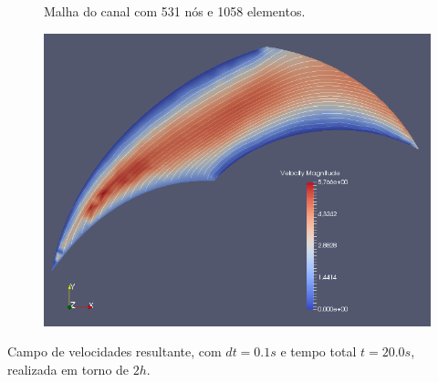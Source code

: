 \documentclass{beamer}
\begin{document}
\begin{frame}
  \frametitle{\subsecname}
  
  \centering
  \begin{figure}
     {\raggedleft \tiny Malha do canal com 531 nós e 1058 elementos.}
  \end{figure}
  \vspace*{-\baselineskip}\setlength\belowdisplayshortskip{0pt} %
  \begin{figure}
      \includegraphics[height=0.38\textheight]{figure/results/Rotor_result.png}
  \end{figure}
  \raggedleft \tiny Campo de velocidades resultante, com $dt=0.1s$ e tempo total $t=20.0s$, realizada em torno de $2h$.
\end{frame}
  
\end{document}
